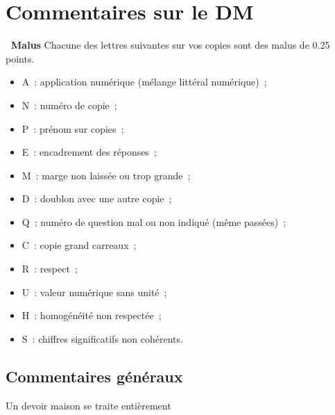 \documentclass[a4paper, 10pt, final, garamond]{book}
\begin{document}
\setcounter{chapter}{0}

\chapter{Commentaires sur le DM}

\begin{NCprop}[width=\linewidth]{\centering\bfseries\ Malus}
    Chacune des lettres suivantes sur vos copies sont des malus de \num{0.25}
    points.\smallbreak
    \begin{minipage}{0.50\linewidth}
        \begin{itemize}
            \item A~: application numérique (mélange littéral numérique)~;
            \item N~: numéro de copie~;
            \item P~: prénom sur copies~;
            \item E~: encadrement des réponses~;
            \item M~: marge non laissée ou trop grande~;
            \item D~: doublon avec une autre copie~;
        \end{itemize}
    \end{minipage}
    \begin{minipage}{0.50\linewidth}
        \begin{itemize}
            \item Q~: numéro de question mal ou non indiqué (même passées)~;
            \item C~: copie grand carreaux~;
            \item R~: respect~;
            \item U~: valeur numérique sans unité~;
            \item H~: homogénéité non respectée~;
            \item S~: chiffres significatifs non cohérents.
        \end{itemize}
    \end{minipage}
\end{NCprop}

\section{Commentaires généraux}
\begin{center}
    \Huge Un devoir maison se traite entièrement
\end{center}
\end{document}

